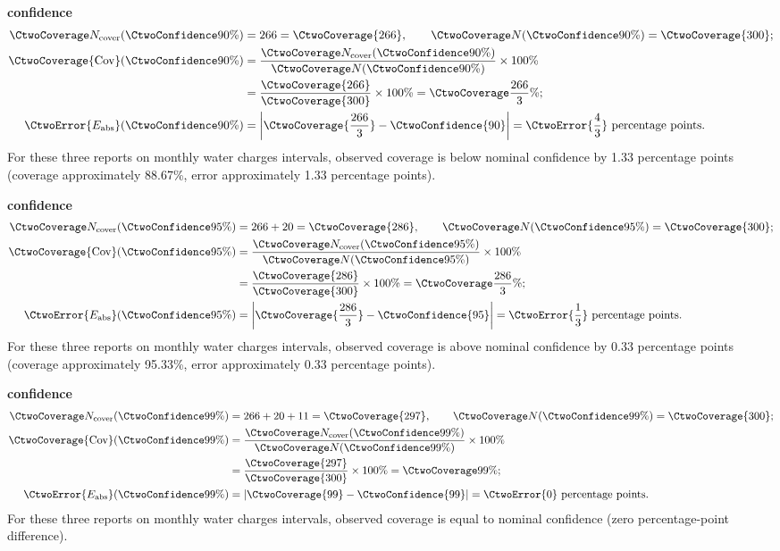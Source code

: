 \textbf{ confidence}\nopagebreak[4]
\begin{align*}
\CtwoCoverCount(\CtwoConfidence{90\%})&=266=\CtwoCoverage{266},
\qquad\CtwoTotalCount(\CtwoConfidence{90\%})=\CtwoCoverage{300};\\
\CtwoCoverage{\mathrm{Cov}}(\CtwoConfidence{90\%})
&=\frac{\CtwoCoverCount(\CtwoConfidence{90\%})}{\CtwoTotalCount(\CtwoConfidence{90\%})}\times100\%
\\
&=\frac{\CtwoCoverage{266}}{\CtwoCoverage{300}}\times100\%=\CtwoCoverage{\frac{266}{3}\%};\\
\CtwoError{E_{\rm abs}}(\CtwoConfidence{90\%})
&=\left|\CtwoCoverage{\frac{266}{3}}-\CtwoConfidence{90}\right|=\CtwoError{\frac{4}{3}}\ \text{percentage points}.
\end{align*}
For these three reports on monthly water charges intervals, observed coverage is below nominal confidence by 1.33 percentage points (coverage approximately 88.67\%, error approximately 1.33 percentage points).

\textbf{ confidence}\nopagebreak[4]
\begin{align*}
\CtwoCoverCount(\CtwoConfidence{95\%})&=266+20=\CtwoCoverage{286},
\qquad\CtwoTotalCount(\CtwoConfidence{95\%})=\CtwoCoverage{300};\\
\CtwoCoverage{\mathrm{Cov}}(\CtwoConfidence{95\%})
&=\frac{\CtwoCoverCount(\CtwoConfidence{95\%})}{\CtwoTotalCount(\CtwoConfidence{95\%})}\times100\%
\\
&=\frac{\CtwoCoverage{286}}{\CtwoCoverage{300}}\times100\%=\CtwoCoverage{\frac{286}{3}\%};\\
\CtwoError{E_{\rm abs}}(\CtwoConfidence{95\%})
&=\left|\CtwoCoverage{\frac{286}{3}}-\CtwoConfidence{95}\right|=\CtwoError{\frac{1}{3}}\ \text{percentage points}.
\end{align*}
For these three reports on monthly water charges intervals, observed coverage is above nominal confidence by 0.33 percentage points (coverage approximately 95.33\%, error approximately 0.33 percentage points).

\clearpage
\textbf{ confidence}\nopagebreak[4]
\begin{align*}
\CtwoCoverCount(\CtwoConfidence{99\%})&=266+20+11=\CtwoCoverage{297},
\qquad\CtwoTotalCount(\CtwoConfidence{99\%})=\CtwoCoverage{300};\\
\CtwoCoverage{\mathrm{Cov}}(\CtwoConfidence{99\%})
&=\frac{\CtwoCoverCount(\CtwoConfidence{99\%})}{\CtwoTotalCount(\CtwoConfidence{99\%})}\times100\%
\\
&=\frac{\CtwoCoverage{297}}{\CtwoCoverage{300}}\times100\%=\CtwoCoverage{99\%};\\
\CtwoError{E_{\rm abs}}(\CtwoConfidence{99\%})
&=\left|\CtwoCoverage{99}-\CtwoConfidence{99}\right|=\CtwoError{0}\ \text{percentage points}.
\end{align*}
For these three reports on monthly water charges intervals, observed coverage is equal to nominal confidence (zero percentage-point difference).

